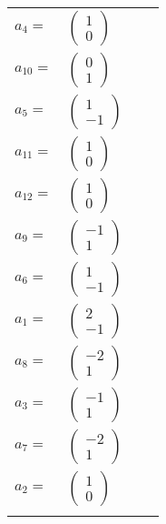 \documentclass[1p]{elsarticle_modified}
\theoremstyle{definition}
\begin{document}
\begin{tabular}{m{7pt} m{180pt} m{7pt} m{180pt} }
\flushright $a_{4}=$&$\begin{pmatrix}1\\0\end{pmatrix}$ \\
\flushright $a_{10}=$&$\begin{pmatrix}0\\1\end{pmatrix}$ \\
\flushright $a_{5}=$&$\begin{pmatrix}1\\-1\end{pmatrix}$ \\
\flushright $a_{11}=$&$\begin{pmatrix}1\\0\end{pmatrix}$ \\
\flushright $a_{12}=$&$\begin{pmatrix}1\\0\end{pmatrix}$ \\
\flushright $a_{9}=$&$\begin{pmatrix}-1\\1\end{pmatrix}$ \\
\flushright $a_{6}=$&$\begin{pmatrix}1\\-1\end{pmatrix}$ \\
\flushright $a_{1}=$&$\begin{pmatrix}2\\-1\end{pmatrix}$ \\
\flushright $a_{8}=$&$\begin{pmatrix}-2\\1\end{pmatrix}$ \\
\flushright $a_{3}=$&$\begin{pmatrix}-1\\1\end{pmatrix}$ \\
\flushright $a_{7}=$&$\begin{pmatrix}-2\\1\end{pmatrix}$ \\
\flushright $a_{2}=$&$\begin{pmatrix}1\\0\end{pmatrix}$\\&\end{tabular}
\end{document}
